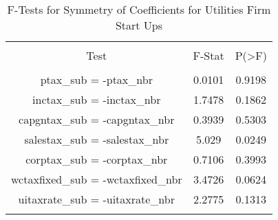 
\begin{table}[!htbp] \centering 
  \caption{F-Tests for Symmetry of Coefficients for Utilities Firm Start Ups} 
  \label{22Ftests} 
\begin{tabular}{@{\extracolsep{5pt}} ccc} 
\\[-1.8ex]\hline 
\hline \\[-1.8ex] 
Test & F-Stat & P(\textgreater F) \\ 
\hline \\[-1.8ex] 
ptax\_sub = -ptax\_nbr & 0.0101 & 0.9198 \\ 
inctax\_sub = -inctax\_nbr & 1.7478 & 0.1862 \\ 
capgntax\_sub = -capgntax\_nbr & 0.3939 & 0.5303 \\ 
salestax\_sub = -salestax\_nbr & 5.029 & 0.0249 \\ 
corptax\_sub = -corptax\_nbr & 0.7106 & 0.3993 \\ 
wctaxfixed\_sub = -wctaxfixed\_nbr & 3.4726 & 0.0624 \\ 
uitaxrate\_sub = -uitaxrate\_nbr & 2.2775 & 0.1313 \\ 
\hline \\[-1.8ex] 
\end{tabular} 
\end{table} 
